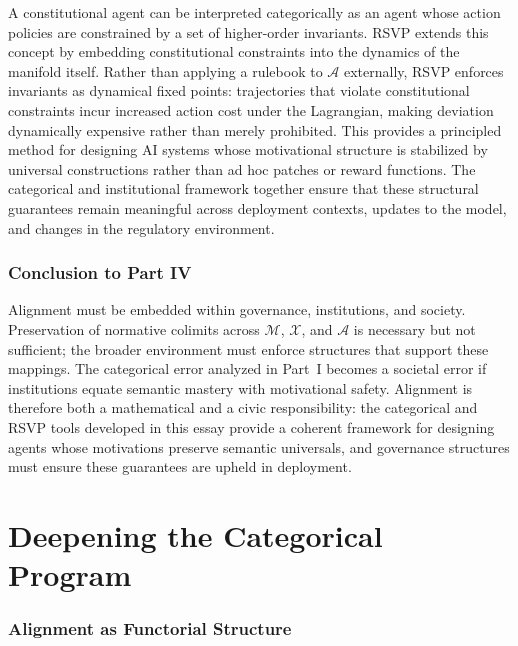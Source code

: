 \documentclass[12pt]{article}
\theoremstyle{definition}
\begin{document}
A constitutional agent \citep{bai2024constitutional} can be interpreted
categorically as an agent whose action policies are constrained by a set of
higher-order invariants. RSVP extends this concept by embedding constitutional
constraints into the dynamics of the manifold itself. Rather than applying a
rulebook to $\mathcal{A}$ externally, RSVP enforces invariants as dynamical
fixed points: trajectories that violate constitutional constraints incur
increased action cost under the Lagrangian, making deviation dynamically
expensive rather than merely prohibited. This provides a principled method for
designing AI systems whose motivational structure is stabilized by universal
constructions rather than ad hoc patches or reward functions. The categorical
and institutional framework together ensure that these structural guarantees
remain meaningful across deployment contexts, updates to the model, and changes
in the regulatory environment.

\section{Conclusion to Part IV}

Alignment must be embedded within governance, institutions, and society.
Preservation of normative colimits across $\mathcal{M}$, $\mathcal{X}$, and
$\mathcal{A}$ is necessary but not sufficient; the broader environment must
enforce structures that support these mappings. The categorical error analyzed
in Part~I becomes a societal error if institutions equate semantic mastery with
motivational safety. Alignment is therefore both a mathematical and a civic
responsibility: the categorical and RSVP tools developed in this essay provide a
coherent framework for designing agents whose motivations preserve semantic
universals, and governance structures must ensure these guarantees are upheld in
deployment.


\part{Deepening the Categorical Program}

\section{Alignment as Functorial Structure}
\end{document}
